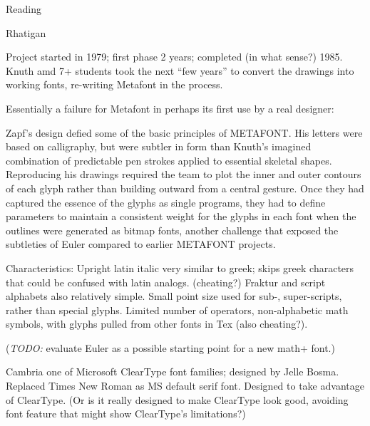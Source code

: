 \documentclass[11pt]{PalisadesLakesBook}
\begin{document}
\begin{plSection}{Reading}
\begin{plSection}{Rhatigan}
\begin{plSection}{}
\begin{plSection}{}
Project started in 1979; first phase 2 years;
completed (in what sense?) 1985.
Knuth amd 7+ students took the next ``few years''
to convert the drawings into working fonts,
re-writing Metafont in the process.

Essentially a failure for Metafont in perhaps its first use 
by a real designer:
\begin{plQuote}{{}}{}
Zapf's design defied some of the basic principles of METAFONT. 
His letters were based on calligraphy, 
but were subtler in form than Knuth's imagined combination 
of predictable pen strokes applied to essential skeletal shapes. 
Reproducing his drawings required the team 
to plot the inner and outer contours of each glyph 
rather than building outward from a central gesture. 
Once they had captured the essence of the glyphs 
as single programs, 
they had to define parameters to maintain a consistent weight 
for the glyphs in each font 
when the outlines were generated as bitmap fonts, 
another challenge that exposed the subtleties of Euler 
compared to earlier METAFONT projects.
\end{plQuote}

Characteristics:
Upright latin italic very similar to greek;
skips greek characters that could be confused with latin analogs.
(cheating?)
Fraktur and script alphabets also relatively simple.
Small point size used for sub-, super-scripts, rather than special
glyphs.
Limited number of operators, non-alphabetic math symbols,
with glyphs pulled from other fonts in Tex (also cheating?).

(\emph{TODO:} evaluate Euler as a possible starting point 
for a new math+ font.)

\end{plSection}%
\begin{plSection}{}

Cambria one of Microsoft ClearType font families;
designed by Jelle Bosma.
Replaced Times New Roman as MS default serif font.
Designed to take advantage of ClearType.
(Or is it really designed
to make ClearType look good, avoiding font feature that might show
ClearType's limitations?)


\end{plSection}
\end{plSection}
\end{plSection}
\end{plSection}
\end{document}
